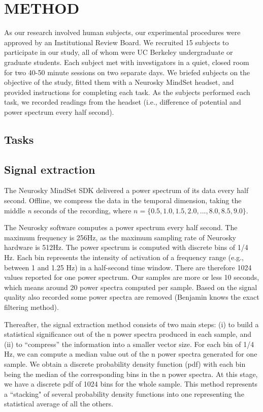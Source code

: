 \section{\uppercase{Method}}

As our research involved human subjects, our experimental procedures were approved by an Institutional Review Board. We recruited 15 subjects to participate in our study, all of whom were UC Berkeley undergraduate or graduate students. Each subject met with investigators in a quiet, closed room for two 40-50 minute sessions on two separate days. We briefed subjects on the objective of the study, fitted them with a Neurosky MindSet headset, and provided instructions for completing each task. As the subjects performed each task, we recorded readings from the headset (i.e., difference of potential and power spectrum every half second).

\subsection{Tasks}


\subsection{Signal extraction}

The Neurosky MindSet SDK delivered a power spectrum of its data every half second. Offline, we compress the data in the temporal dimension, taking the middle \textit{n} seconds of the recording, where $n = \{0.5, 1.0,1.5, 2.0,...,8.0, 8.5, 9.0\}$. 

The Neurosky software computes a power spectrum every half second. The maximum frequency is 256Hz, as the maximum sampling rate of Neurosky hardware is 512Hz. The power spectrum is computed with discrete bins of 1/4 Hz. Each bin represents the intensity of activation of a frequency range (e.g., between 1 and 1.25 Hz) in a half-second time window. There are therefore 1024 values reported for one power spectrum. Our samples are more or less 10 seconds, which means around 20 power spectra computed per sample. Based on the signal quality also recorded some power spectra are removed (Benjamin knows the exact filtering method).

Thereafter, the signal extraction method consists of two main steps: (i) to build a statistical significance out of the n power spectra produced in each sample, and (ii) to ``compress'' the information into a smaller vector size. For each bin of 1/4 Hz, we can compute a median value out of the n power spectra generated for one sample.  We obtain a discrete probability density function (pdf) with each bin being the median of the corresponding bins in the n power spectra. At this stage, we have a discrete pdf of 1024 bins for the whole sample. This method represents a ``stacking" of several probability density functions into one representing the statistical average of all the others.

